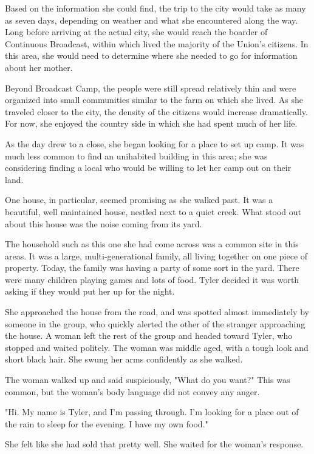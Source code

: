 \documentclass[courier]{sffms}
\begin{document}
Based on the information she could find, the trip to the city
would take as many as seven days, depending on weather
and what she encountered along the way. Long before arriving
at the actual city, she would reach the boarder of Continuous
Broadcast, within which lived the majority of the Union's
citizens. In this area, she would need to determine where she
needed to go for information about her mother.

Beyond Broadcast Camp, the people were still spread relatively
thin and were organized into small communities similar to the
farm on which she lived. As she traveled closer to the city, the
density of the citizens would increase dramatically. For now, she
enjoyed the country side in which she had spent much of her
life.

As the day drew to a close, she began looking for a place to
set up camp. It was much less common to find an unihabited
building in this area; she was considering finding a local who
would be willing to let her camp out on their land.

One house, in particular, seemed promising as she walked past.
It was a beautiful, well maintained house, nestled next to a 
quiet creek. What stood out about this house was the noise
coming from its yard.

The household such as this one she had come across was a
common site in this areas. It was a large, multi-generational
family, all living together on one piece of property. Today,
the family was having a party of some sort in the yard. There
were many children playing games and lots of food. Tyler
decided it was worth asking if they would put her up for the
night.

She approached the house from the road, and was spotted
almost immediately by someone in the group, who quickly
alerted the other of the stranger approaching the house.
A woman left the rest of the group and headed toward
Tyler, who stopped and waited politely. The woman was
middle aged, with a tough look and short black hair. She
swung her arms confidently as she walked.

The woman walked up and said suspiciously, "What do you
want?" This was common, but the woman's body language
did not convey any anger.

"Hi. My name is Tyler, and I'm passing through. I'm looking
for a place out of the rain to sleep for the evening. I have my
own food."

She felt like she had sold that pretty well. She waited for the
woman's response.
\end{document}
